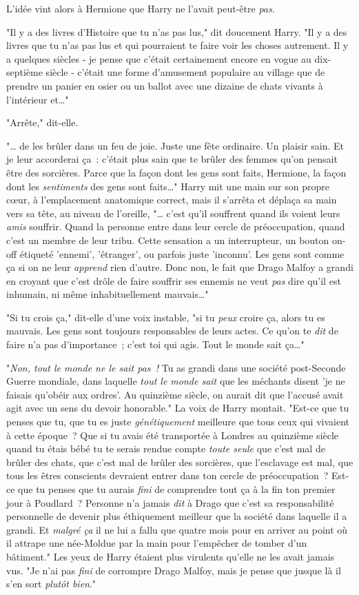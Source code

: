 L'idée vint alors à Hermione que Harry ne l'avait peut-être \emph{pas}.

"Il y a des livres d'Histoire que tu n'as pas lus," dit doucement Harry. "Il y a des livres que tu n'as pas lus et qui pourraient te faire voir les choses autrement. Il y a quelques siècles - je pense que c'était certainement encore en vogue au dix-septième siècle - c'était une forme d'amusement populaire au village que de prendre un panier en osier ou un ballot avec une dizaine de chats vivants à l'intérieur et…"

"Arrête," dit-elle.

"… de les brûler dans un feu de joie. Juste une fête ordinaire. Un plaisir sain. Et je leur accorderai ça~: c'était plus sain que te brûler des femmes qu'on pensait être des sorcières. Parce que la façon dont les gens sont faits, Hermione, la façon dont les \emph{sentiments} des gens sont faits…" Harry mit une main sur son propre cœur, à l'emplacement anatomique correct, mais il s'arrêta et déplaça sa main vers sa tête, au niveau de l'oreille, "… c'est qu'il souffrent quand ils voient leurs \emph{amis} souffrir. Quand la personne entre dans leur cercle de préoccupation, quand c'est un membre de leur tribu. Cette sensation a un interrupteur, un bouton on-off étiqueté 'ennemi', 'étranger', ou parfois juste 'inconnu'. Les gens sont comme ça si on ne leur \emph{apprend} rien d'autre. Donc non, le fait que Drago Malfoy a grandi en croyant que c'est drôle de faire souffrir ses ennemis ne veut \emph{pas} dire qu'il est inhumain, ni même inhabituellement mauvais…"

"Si tu crois ça," dit-elle d'une voix instable, "si tu \emph{peux} croire ça, alors tu es mauvais. Les gens sont toujours responsables de leurs actes. Ce qu'on te \emph{dit} de faire n'a pas d'importance~; c'est toi qui agis. Tout le monde sait ça…"

"\emph{Non, tout le monde ne le sait pas~!} Tu as grandi dans une société post-Seconde Guerre mondiale, dans laquelle \emph{tout le monde sait} que les méchants disent 'je ne faisais qu'obéir aux ordres'. Au quinzième siècle, on aurait dit que l'accusé avait agit avec un sens du devoir honorable." La voix de Harry montait. "Est-ce que tu penses que tu, que tu es juste \emph{génétiquement} meilleure que tous ceux qui vivaient à cette époque~? Que si tu avais été transportée à Londres au quinzième siècle quand tu étais bébé tu te serais rendue compte \emph{toute seule} que c'est mal de brûler des chats, que c'est mal de brûler des sorcières, que l'esclavage est mal, que tous les êtres conscients devraient entrer dans ton cercle de préoccupation~? Est-ce que tu penses que tu aurais \emph{fini} de comprendre tout ça à la fin ton premier jour à Poudlard~? Personne n'a jamais \emph{dit} à Drago que c'est sa responsabilité personnelle de devenir plus éthiquement meilleur que la société dans laquelle il a grandi. Et \emph{malgré ça} il ne lui a fallu que quatre mois pour en arriver au point où il attrape une née-Moldue par la main pour l'empêcher de tomber d'un bâtiment." Les yeux de Harry étaient plus virulents qu'elle ne les avait jamais vus. "Je n'ai pas \emph{fini} de corrompre Drago Malfoy, mais je pense que jusque là il s'en sort \emph{plutôt bien}."

